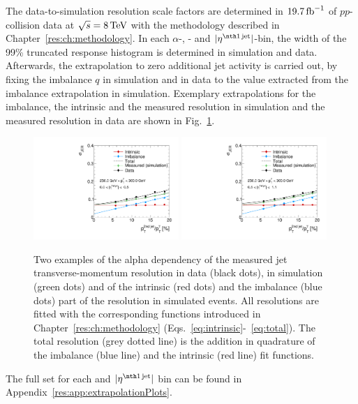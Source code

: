 The data-to-simulation resolution scale factors \rhores are determined in $19.7\,\text{fb}^{-1}$ of $pp$-collision data at $\sqrt{s} = 8 \,\text{Te}\kern-0.06667em\text{V}$ with the methodology described in Chapter~\ref{res:ch:methodology}.
In each $\alpha$-, \ptgamma- and $|\etafirstjet|$-bin, the width of the 99\% truncated response histogram is determined in simulation and data.
Afterwards, the extrapolation to zero additional jet activity is carried out, by fixing the imbalance $q$ in simulation and in data to the value extracted from the imbalance extrapolation in simulation.
Exemplary extrapolations for the imbalance, the intrinsic and the measured resolution in simulation and the measured resolution in data are shown in Fig.~\ref{res:fig:ExtrapolationsWithData}.
\begin{figure}[!t]
 \centering
    \includegraphics[width=0.49\textwidth]{figures/resolution/results/JER_for_1_eta_bin_10_pTGamma_bin_all_contributions_PFCHS_RMS99_mc.pdf}
    \includegraphics[width=0.49\textwidth]{figures/resolution/results/JER_for_2_eta_bin_10_pTGamma_bin_all_contributions_PFCHS_RMS99_mc.pdf}
  \caption{Two examples of the alpha dependency of the measured jet transverse-momentum resolution in data (black dots), in simulation (green dots) and  of the intrinsic (red dots) and the imbalance (blue dots) part 
           of the resolution in simulated events. All resolutions are fitted with the corresponding functions introduced in Chapter~\ref{res:ch:methodology} (Eqs.~\eqref{eq:intrinsic}-~\eqref{eq:total}).
           The total resolution (grey dotted line) is the addition in quadrature of the imbalance (blue line) and the intrinsic (red line) fit functions. }
  \label{res:fig:ExtrapolationsWithData}
\end{figure}
The full set for each \ptgamma and $|\etafirstjet|$ bin can be found in Appendix~\ref{res:app:extrapolationPlots}.

